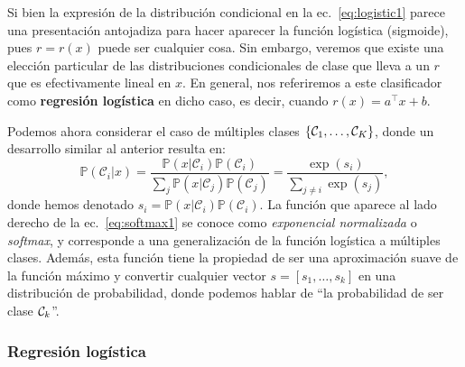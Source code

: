 \begin{remark} Si bien la expresión de la distribución condicional en la ec.~\eqref{eq:logistic1} parece una presentación antojadiza para hacer aparecer la  función logística (sigmoide), pues $r=r(x)$ puede ser cualquier cosa. Sin embargo, veremos que existe una elección particular de las distribuciones condicionales de clase que lleva a un $r$ que es efectivamente lineal en $x$. En general, nos  referiremos a este clasificador como \textbf{regresión logística} en dicho caso, es decir, cuando $r(x) = a^\top x  + b$.
\end{remark} 

Podemos ahora considerar el caso de múltiples clases $\{{\mathcal C}_1,\ldots,{\mathcal C}_K\}$, donde un desarrollo similar al anterior resulta en:  
\begin{equation}
	\mathbb{P}(\mathcal{C}_i | x) = \frac{\mathbb{P}(x | \mathcal{C}_i)\mathbb{P}(\mathcal{C}_i)}{\sum_{j}\mathbb{P}(x | \mathcal{C}_j)\mathbb{P}(\mathcal{C}_j)} = \frac{\exp(s_i)}{\sum_{j\neq i}\exp(s_j)},\label{eq:softmax1}
\end{equation}
donde hemos denotado $s_i = \mathbb{P}(x | \mathcal{C}_i)\mathbb{P}(\mathcal{C}_i)$. La función que aparece al lado derecho de la  ec.~\eqref{eq:softmax1} se conoce como \emph{exponencial normalizada} o \emph{softmax}, y corresponde a una generalización de la función logística a múltiples clases. Además, esta función tiene la propiedad de ser una aproximación suave de la función máximo y convertir cualquier vector $s=[s_1,\ldots,s_k]$ en una distribución de probabilidad, donde podemos hablar de ``la probabilidad de ser clase ${\mathcal C}_k$''.

\subsubsection{Regresión logística} 
\label{sub:reg_log}

